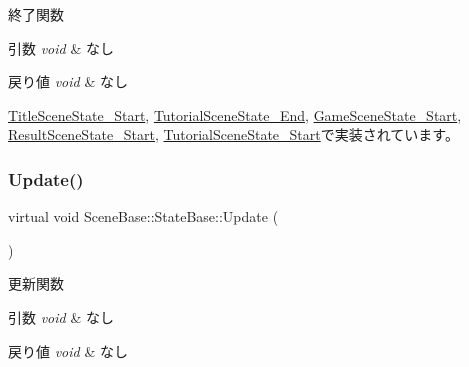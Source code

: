 終了関数 


\begin{DoxyParams}{引数}
{\em void} & なし \\
\hline
\end{DoxyParams}

\begin{DoxyRetVals}{戻り値}
{\em void} & なし \\
\hline
\end{DoxyRetVals}


\mbox{\hyperlink{class_title_scene_state___start_a5bcb4d7a9250ea1c0041c38616ffabfe}{Title\+Scene\+State\+\_\+\+Start}}, \mbox{\hyperlink{class_tutorial_scene_state___end_aafc0d8d042de8c7f79d84fcdc35a807c}{Tutorial\+Scene\+State\+\_\+\+End}}, \mbox{\hyperlink{class_game_scene_state___start_a636df8b7ac0173b044b0efc2927fb83b}{Game\+Scene\+State\+\_\+\+Start}}, \mbox{\hyperlink{class_result_scene_state___start_af5b9af607074e3296481a1660607fb9a}{Result\+Scene\+State\+\_\+\+Start}}, \mbox{\hyperlink{class_tutorial_scene_state___start_a974962addfb0bcba90fbab64ac6d50f0}{Tutorial\+Scene\+State\+\_\+\+Start}}で実装されています。

\mbox{\label{class_scene_base_1_1_state_base_ad2c6c8fd9f020eb02f64f394edee129c}} 
\subsubsection{\texorpdfstring{Update()}{Update()}}
{\footnotesize\ttfamily virtual void Scene\+Base\+::\+State\+Base\+::\+Update (\begin{DoxyParamCaption}{ }\end{DoxyParamCaption})\hspace{0.3cm}{\ttfamily [pure virtual]}}



更新関数 


\begin{DoxyParams}{引数}
{\em void} & なし \\
\hline
\end{DoxyParams}

\begin{DoxyRetVals}{戻り値}
{\em void} & なし \\
\hline
\end{DoxyRetVals}


